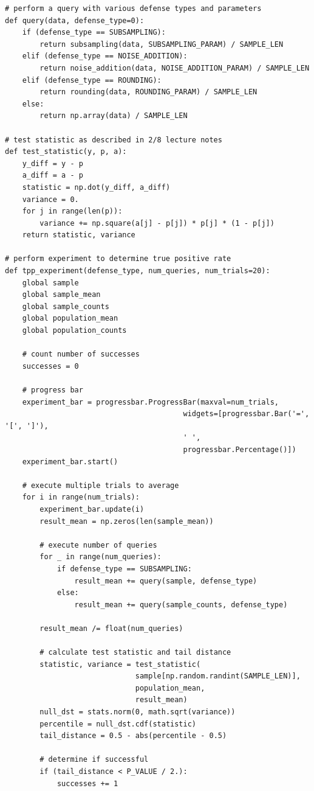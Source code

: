 \documentclass[12pt]{article}
\begin{document}
\begin{appendices}
\begin{lstlisting}
# perform a query with various defense types and parameters
def query(data, defense_type=0):
    if (defense_type == SUBSAMPLING):
        return subsampling(data, SUBSAMPLING_PARAM) / SAMPLE_LEN
    elif (defense_type == NOISE_ADDITION):
        return noise_addition(data, NOISE_ADDITION_PARAM) / SAMPLE_LEN
    elif (defense_type == ROUNDING):
        return rounding(data, ROUNDING_PARAM) / SAMPLE_LEN
    else:
        return np.array(data) / SAMPLE_LEN

# test statistic as described in 2/8 lecture notes
def test_statistic(y, p, a):
    y_diff = y - p
    a_diff = a - p
    statistic = np.dot(y_diff, a_diff)
    variance = 0.
    for j in range(len(p)):
        variance += np.square(a[j] - p[j]) * p[j] * (1 - p[j])
    return statistic, variance

# perform experiment to determine true positive rate
def tpp_experiment(defense_type, num_queries, num_trials=20):
    global sample
    global sample_mean
    global sample_counts
    global population_mean
    global population_counts

    # count number of successes
    successes = 0

    # progress bar
    experiment_bar = progressbar.ProgressBar(maxval=num_trials,
                                         widgets=[progressbar.Bar('=', '[', ']'),
                                         ' ',
                                         progressbar.Percentage()])
    experiment_bar.start()

    # execute multiple trials to average
    for i in range(num_trials):
        experiment_bar.update(i)
        result_mean = np.zeros(len(sample_mean))

        # execute number of queries
        for _ in range(num_queries):
            if defense_type == SUBSAMPLING:
                result_mean += query(sample, defense_type)
            else:
                result_mean += query(sample_counts, defense_type)

        result_mean /= float(num_queries)

        # calculate test statistic and tail distance
        statistic, variance = test_statistic(
                              sample[np.random.randint(SAMPLE_LEN)],
                              population_mean,
                              result_mean)
        null_dst = stats.norm(0, math.sqrt(variance))
        percentile = null_dst.cdf(statistic)
        tail_distance = 0.5 - abs(percentile - 0.5)

        # determine if successful
        if (tail_distance < P_VALUE / 2.):
            successes += 1


\end{lstlisting}
\end{appendices}
\end{document}
